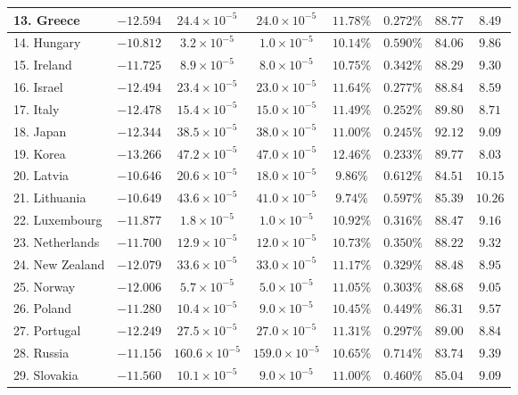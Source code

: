 \documentclass[12pt, titlepage]{article}%
\begin{document}
\begin{table}
\begin{center}
\begin{tabular}{||l|c|c|c|c|c|c|c||}
13. Greece &  $-12.594$ & $24.4\times10^{-5}$ & $24.0\times10^{-5}$ & $11.78\%$ & $0.272\%$ & $88.77$ & $8.49$\\ \hline
14. Hungary &  $-10.812$ & $3.2\times10^{-5}$ & $1.0\times10^{-5}$ & $10.14\%$ & $0.590\%$ & $84.06$ & $9.86$\\ \hline
15. Ireland &  $-11.725$ & $8.9\times10^{-5}$ & $8.0\times10^{-5}$ & $10.75\%$ & $0.342\%$ & $88.29$ & $9.30$\\ \hline
16. Israel &  $-12.494$ & $23.4\times10^{-5}$ & $23.0\times10^{-5}$ & $11.64\%$ & $0.277\%$ & $88.84$ & $8.59$\\ \hline
17. Italy &  $-12.478$ & $15.4\times10^{-5}$ & $15.0\times10^{-5}$ & $11.49\%$ & $0.252\%$ & $89.80$ & $8.71$\\ \hline
18. Japan &  $-12.344$ & $38.5\times10^{-5}$ & $38.0\times10^{-5}$ & $11.00\%$ & $0.245\%$ & $92.12$ & $9.09$\\ \hline
19. Korea &  $-13.266$ & $47.2\times10^{-5}$ & $47.0\times10^{-5}$ & $12.46\%$ & $0.233\%$ & $89.77$ & $8.03$\\ \hline
20. Latvia &  $-10.646$ & $20.6\times10^{-5}$ & $18.0\times10^{-5}$ & $9.86\%$ & $0.612\%$ & $84.51$ & $10.15$\\ \hline
21. Lithuania &  $-10.649$ & $43.6\times10^{-5}$ & $41.0\times10^{-5}$ & $9.74\%$ & $0.597\%$ & $85.39$ & $10.26$\\ \hline
22. Luxembourg &  $-11.877$ & $1.8\times10^{-5}$ & $1.0\times10^{-5}$ & $10.92\%$ & $0.316\%$ & $88.47$ & $9.16$\\ \hline
23. Netherlands &  $-11.700$ & $12.9\times10^{-5}$ & $12.0\times10^{-5}$ & $10.73\%$ & $0.350\%$ & $88.22$ & $9.32$\\ \hline
24. New Zealand &  $-12.079$ & $33.6\times10^{-5}$ & $33.0\times10^{-5}$ & $11.17\%$ & $0.329\%$ & $88.48$ & $8.95$\\ \hline
25. Norway &  $-12.006$ & $5.7\times10^{-5}$ & $5.0\times10^{-5}$ & $11.05\%$ & $0.303\%$ & $88.68$ & $9.05$\\ \hline
26. Poland &  $-11.280$ & $10.4\times10^{-5}$ & $9.0\times10^{-5}$ & $10.45\%$ & $0.449\%$ & $86.31$ & $9.57$\\ \hline
27. Portugal &  $-12.249$ & $27.5\times10^{-5}$ & $27.0\times10^{-5}$ & $11.31\%$ & $0.297\%$ & $89.00$ & $8.84$\\ \hline
28. Russia &  $-11.156$ & $160.6\times10^{-5}$ & $159.0\times10^{-5}$ & $10.65\%$ & $0.714\%$ & $83.74$ & $9.39$\\ \hline
29. Slovakia &  $-11.560$ & $10.1\times10^{-5}$ & $9.0\times10^{-5}$ & $11.00\%$ & $0.460\%$ & $85.04$ & $9.09$\\ \hline

\end{tabular}
\end{center}
\end{table}
\end{document}
